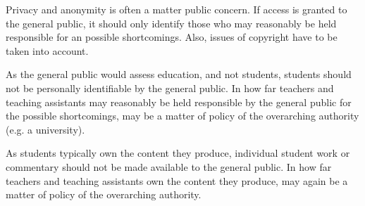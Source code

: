 Privacy and anonymity is often a matter public concern. If access is granted to
the general public, it should only identify those who may reasonably be held
responsible for an possible shortcomings. Also, issues of
copyright have to be taken into account.

As the general public would assess education, and not students, students should
not be personally identifiable by the general public. In how far teachers and
teaching assistants may reasonably be held responsible by the general public
for the possible shortcomings, may be a matter of policy of the overarching
authority (e.g.  a university).

As students typically own the content they produce, individual student work or
commentary should not be made available to the general public. In how far
teachers and teaching assistants own the content they produce, may again be a
matter of policy of the overarching authority.
